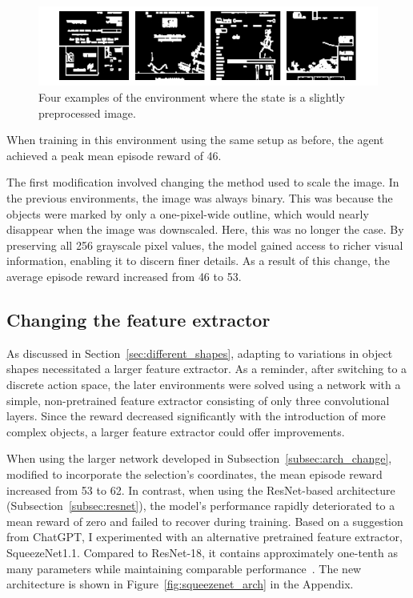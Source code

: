 \documentclass[
  digital,     %
  oneside,     %
  nosansbold,  %
  nocolorbold, %
  lof,         %
  lot,         %
]{fithesis4}
\begin{document}
\begin{figure}
    \centering
    \includegraphics[width=1\linewidth]{env_examples/env9.pdf}
    \caption{Four examples of the environment where the state is a slightly preprocessed image.}
    \label{fig:env9}
\end{figure}

When training in this environment using the same setup as before, the agent achieved a peak mean episode reward of 46.

The first modification involved changing the method used to scale the image. In the previous environments, the image was always binary. This was because the objects were marked by only a one-pixel-wide outline, which would nearly disappear when the image was downscaled. Here, this was no longer the case. By preserving all 256 grayscale pixel values, the model gained access to richer visual information, enabling it to discern finer details. As a result of this change, the average episode reward increased from 46 to 53.

\subsection{Changing the feature extractor}
\label{subsec:feat_extract_two}

As discussed in Section~\ref{sec:different_shapes}, adapting to variations in object shapes necessitated a larger feature extractor. As a reminder, after switching to a discrete action space, the later environments were solved using a network with a simple, non-pretrained feature extractor consisting of only three convolutional layers. Since the reward decreased significantly with the introduction of more complex objects, a larger feature extractor could offer improvements.

When using the larger network developed in Subsection~\ref{subsec:arch_change}, modified to incorporate the selection's coordinates, the mean episode reward increased from 53 to 62. In contrast, when using the ResNet-based architecture (Subsection~\ref{subsec:resnet}), the model's performance rapidly deteriorated to a mean reward of zero and failed to recover during training. Based on a suggestion from ChatGPT, I experimented with an alternative pretrained feature extractor, SqueezeNet1.1. Compared to ResNet-18, it contains approximately one-tenth as many parameters while maintaining comparable performance~\cite{torchvision2016}. The new architecture is shown in Figure~\ref{fig:squeezenet_arch} in the Appendix.
\end{document}
